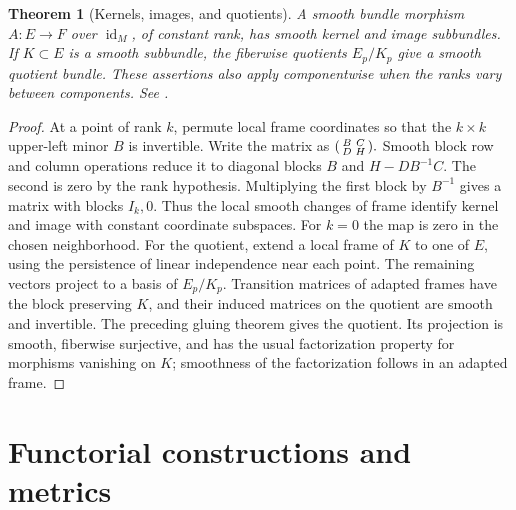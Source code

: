 \documentclass[11pt,oneside,openany]{book}
\newtheorem{theorem}{Theorem}[chapter]
\theoremstyle{definition}
\theoremstyle{remark}
\DeclareMathOperator{\id}{id}
\begin{document}
\begin{theorem}[Kernels, images, and quotients]\label{p104:M05.03}
A smooth bundle morphism \(A:E\to F\) over \(\id_M\), of constant rank, has smooth kernel and image subbundles. If \(K\subset E\) is a smooth subbundle, the fiberwise quotients \(E_p/K_p\) give a smooth quotient bundle. These assertions also apply componentwise when the ranks vary between components. See \cite[pp.\ 261--268]{lee}.
\end{theorem}
\begin{proof}
At a point of rank \(k\), permute local frame coordinates so that the \(k\times k\) upper-left minor \(B\) is invertible. Write the matrix as
\(
 \begin{psmallmatrix}B&C\\D&H\end{psmallmatrix}.
\)
Smooth block row and column operations reduce it to diagonal blocks \(B\) and \(H-DB^{-1}C\). The second is zero by the rank hypothesis. Multiplying the first block by \(B^{-1}\) gives a matrix with blocks \(I_k,0\). Thus the local smooth changes of frame identify kernel and image with constant coordinate subspaces. For \(k=0\) the map is zero in the chosen neighborhood. For the quotient, extend a local frame of \(K\) to one of \(E\), using the persistence of linear independence near each point. The remaining vectors project to a basis of \(E_p/K_p\). Transition matrices of adapted frames have the block preserving \(K\), and their induced matrices on the quotient are smooth and invertible. The preceding gluing theorem gives the quotient. Its projection is smooth, fiberwise surjective, and has the usual factorization property for morphisms vanishing on \(K\); smoothness of the factorization follows in an adapted frame.
\end{proof}

\section{Functorial constructions and metrics}
\end{document}

